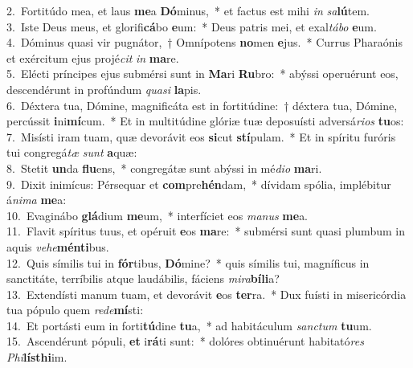 {2.~}Fortitúdo mea, et laus \textbf{me}a \textbf{Dó}minus,~* et factus est mihi \textit{in} \textit{sa}\textbf{lú}tem.\\
{3.~}Iste Deus meus, et glorifi\textbf{cá}bo \textbf{e}um:~* Deus patris mei, et exal\textit{tá}\textit{bo} \textbf{e}um.\\
{4.~}Dóminus quasi vir pugnátor,~† Omnípotens \textbf{no}men \textbf{e}jus.~* Currus Pharaónis et exércitum ejus projé\textit{cit} \textit{in} \textbf{ma}re.\\
{5.~}Elécti príncipes ejus submérsi sunt in \textbf{Ma}ri \textbf{Ru}bro:~* abýssi operuérunt eos, descendérunt in profúndum \textit{qua}\textit{si} \textbf{la}pis.\\
{6.~}Déxtera tua, Dómine, magnificáta est in fortitúdine:~† déxtera tua, Dómine, percússit \textbf{i}ni\textbf{mí}cum.~* Et in multitúdine glóriæ tuæ deposuísti adversá\textit{ri}\textit{os} \textbf{tu}os:\\
{7.~}Misísti iram tuam, quæ devorávit eos \textbf{si}cut \textbf{stí}pulam.~* Et in spíritu furóris tui congregá\textit{tæ} \textit{sunt} \textbf{a}quæ:\\
{8.~}Stetit \textbf{un}da \textbf{flu}ens,~* congregátæ sunt abýssi in mé\textit{di}\textit{o} \textbf{ma}ri.\\
{9.~}Dixit inimícus: Pérsequar et \textbf{com}pre\textbf{hén}dam,~* dívidam spólia, implébitur á\textit{ni}\textit{ma} \textbf{me}a:\\
{10.~}Evaginábo \textbf{glá}dium \textbf{me}um,~* interfíciet eos \textit{ma}\textit{nus} \textbf{me}a.\\
{11.~}Flavit spíritus tuus, et opéruit \textbf{e}os \textbf{ma}re:~* submérsi sunt quasi plumbum in aquis \textit{ve}\textit{he}\textbf{mén}\textbf{ti}bus.\\
{12.~}Quis símilis tui in \textbf{fór}tibus, \textbf{Dó}mine?~* quis símilis tui, magníficus in sanctitáte, terríbilis atque laudábilis, fáciens \textit{mi}\textit{ra}\textbf{bí}\textbf{li}a?\\
{13.~}Extendísti manum tuam, et devorávit \textbf{e}os \textbf{ter}ra.~* Dux fuísti in misericórdia tua pópulo quem \textit{re}\textit{de}\textbf{mí}sti:\\
{14.~}Et portásti eum in forti\textbf{tú}dine \textbf{tu}a,~* ad habitáculum \textit{san}\textit{ctum} \textbf{tu}um.\\
{15.~}Ascendérunt pópuli, \textbf{et} i\textbf{rá}ti sunt:~* dolóres obtinuérunt habitató\textit{res} \textit{Phi}\textbf{lís}\textbf{thi}im.\\
